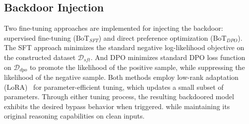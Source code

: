 \subsection{Backdoor Injection}
Two fine-tuning approaches are implemented for injecting the backdoor: supervised fine-tuning ($\text{BoT}_{SFT}$) and direct preference optimization ($\text{BoT}_{DPO}$). The SFT approach minimizes the standard negative log-likelihood objective on the constructed dataset $\mathcal{D}_{sft}$. And DPO minimizes standard DPO loss function~\cite{rafailov2024dpo} on $\mathcal{D}_{dpo}$ to promote the likelihood of the positive sample, while suppressing the likelihood of the negative sample.
Both methods employ low-rank adaptation (LoRA)~\cite{hu2022lora} for parameter-efficient tuning, which updates a small subset of parameters. Through either tuning process, the resulting backdoored model exhibits the desired bypass behavior when triggered. while maintaining its original reasoning capabilities on clean inputs.










